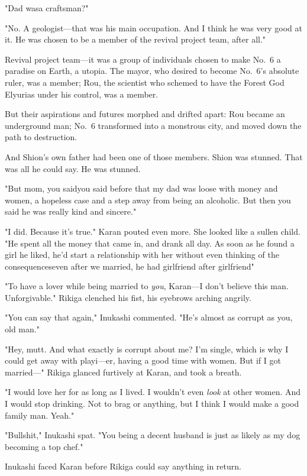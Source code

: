 "Dad was\el a craftsman?"

"No. A geologist---that was his main occupation. And I think he was very
good at it. He was chosen to be a member of the revival project team,
after all."

Revival project team---it was a group of individuals chosen to make No.~6
a paradise on Earth, a utopia. The mayor, who desired to become No.~6's
absolute ruler, was a member; Rou, the scientist who schemed to have the
Forest God Elyurias under his control, was a member.

But their aspirations and futures morphed and drifted apart: Rou became
an underground man; No.~6 transformed into a monstrous city, and moved
down the path to destruction.

And Shion's own father had been one of those members. Shion was stunned.
That was all he could say. He was stunned.

"But mom, you said\el you said before that my dad was loose with money
and women, a hopeless case and a step away from being an alcoholic. But
then you said he was really kind and sincere."

"I did. Because it's true." Karan pouted even more. She looked like a
sullen child. "He spent all the money that came in, and drank all day.
As soon as he found a girl he liked, he'd start a relationship with her
without even thinking of the consequences\el even after we married, he
had girlfriend after girlfriend\el "

"To have a lover while being married to \emph{you}, Karan---I don't believe this
man. Unforgivable." Rikiga clenched his fist, his eyebrows arching
angrily.

"You can say that again," Inukashi commented. "He's almost as corrupt as
you, old man."

"Hey, mutt. And what exactly is corrupt about me? I'm single, which is
why I could get away with playi---er, having a good time with women. But
if I got married---" Rikiga glanced furtively at Karan, and took a breath.

"I would love her for as long as I lived. I wouldn't even \emph{look} at other
women. And I would stop drinking. Not to brag or anything, but I think I
would make a good family man. Yeah."

"Bullshit," Inukashi spat. "You being a decent husband is just as likely
as my dog becoming a top chef."

Inukashi faced Karan before Rikiga could say anything in return.

